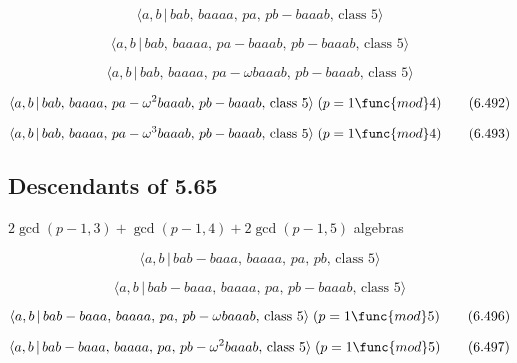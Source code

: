 \documentclass[10pt]{article}
\begin{document}
\begin{equation}
\langle a,b\,|\,bab,\,baaaa,\,pa,\,pb-baaab,\,\text{class }5\rangle 
\tag{6.489}
\end{equation}

\begin{equation}
\langle a,b\,|\,bab,\,baaaa,\,pa-baaab,\,pb-baaab,\,\text{class }5\rangle 
\tag{6.490}
\end{equation}

\begin{equation}
\langle a,b\,|\,bab,\,baaaa,\,pa-\omega baaab,\,pb-baaab,\,\text{class }%
5\rangle  \tag{6.491}
\end{equation}

\begin{equation}
\langle a,b\,|\,bab,\,baaaa,\,pa-\omega ^2baaab,\,pb-baaab,\,\text{class }%
5\rangle\;(p=1 \func{mod} 4)  \tag{6.492}
\end{equation}

\begin{equation}
\langle a,b\,|\,bab,\,baaaa,\,pa-\omega ^3baaab,\,pb-baaab,\,\text{class }%
5\rangle\;(p=1 \func{mod} 4)  \tag{6.493}
\end{equation}

\subsection{Descendants of 5.65}

$2\gcd (p-1,3)+\gcd (p-1,4)+2\gcd (p-1,5)$ algebras

\begin{equation}
\langle a,b\,|\,bab-baaa,\,baaaa,\,pa,\,pb,\,\text{class }5\rangle 
\tag{6.494}
\end{equation}

\begin{equation}
\langle a,b\,|\,bab-baaa,\,baaaa,\,pa,\,pb-baaab,\,\text{class }5\rangle 
\tag{6.495}
\end{equation}

\begin{equation}
\langle a,b\,|\,bab-baaa,\,baaaa,\,pa,\,pb-\omega baaab,\,\text{class }%
5\rangle\;(p=1 \func{mod} 5)  \tag{6.496}
\end{equation}

\begin{equation}
\langle a,b\,|\,bab-baaa,\,baaaa,\,pa,\,pb-\omega ^2baaab,\,\text{class }%
5\rangle\;(p=1 \func{mod} 5)  \tag{6.497}
\end{equation}
\end{document}
